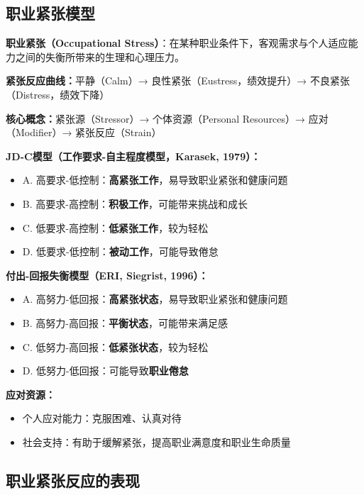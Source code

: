 \subsection{职业紧张模型}

\begin{keybox}
\textbf{职业紧张（Occupational Stress）}：在某种职业条件下，客观需求与个人适应能力之间的失衡所带来的生理和心理压力。

\textbf{紧张反应曲线：}平静（Calm）→ 良性紧张（Eustress，绩效提升）→ 不良紧张（Distress，绩效下降）

\textbf{核心概念：}紧张源（Stressor）→ 个体资源（Personal Resources）→ 应对（Modifier）→ 紧张反应（Strain）

\textbf{JD-C模型（工作要求-自主程度模型，Karasek, 1979）：}
\begin{itemize}[leftmargin=*]
    \item A. 高要求-低控制：\textbf{高紧张工作}，易导致职业紧张和健康问题
    \item B. 高要求-高控制：\textbf{积极工作}，可能带来挑战和成长
    \item C. 低要求-高控制：\textbf{低紧张工作}，较为轻松
    \item D. 低要求-低控制：\textbf{被动工作}，可能导致倦怠
\end{itemize}

\textbf{付出-回报失衡模型（ERI, Siegrist, 1996）：}
\begin{itemize}[leftmargin=*]
    \item A. 高努力-低回报：\textbf{高紧张状态}，易导致职业紧张和健康问题
    \item B. 高努力-高回报：\textbf{平衡状态}，可能带来满足感
    \item C. 低努力-高回报：\textbf{低紧张状态}，较为轻松
    \item D. 低努力-低回报：可能导致\textbf{职业倦怠}
\end{itemize}

\textbf{应对资源：}
\begin{itemize}[leftmargin=*]
    \item 个人应对能力：克服困难、认真对待
    \item 社会支持：有助于缓解紧张，提高职业满意度和职业生命质量
\end{itemize}
\end{keybox}

\subsection{职业紧张反应的表现}

